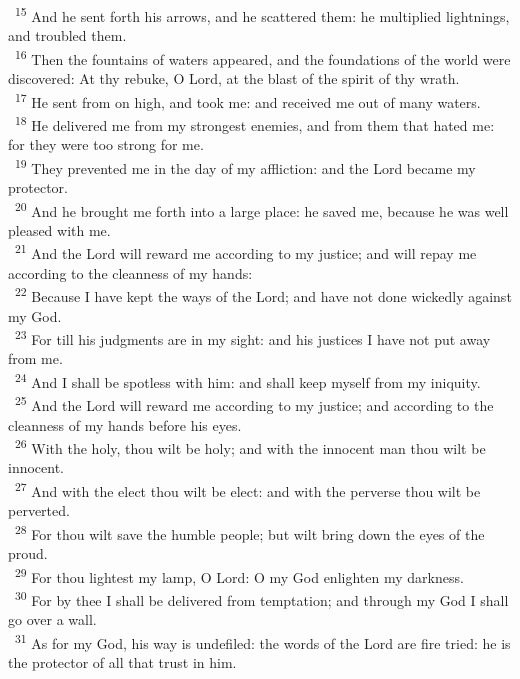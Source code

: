 \documentclass[a5paper,12pt]{article}
\begin{document}
\begin{multicols*}{2}
~\textsuperscript{15} And he sent forth his arrows, and he scattered them: he multiplied lightnings, and troubled them.\\
~\textsuperscript{16} Then the fountains of waters appeared, and the foundations of the world were discovered: At thy rebuke, O Lord, at the blast of the spirit of thy wrath.\\
~\textsuperscript{17} He sent from on high, and took me: and received me out of many waters.\\
~\textsuperscript{18} He delivered me from my strongest enemies, and from them that hated me: for they were too strong for me.\\
~\textsuperscript{19} They prevented me in the day of my affliction: and the Lord became my protector.\\
~\textsuperscript{20} And he brought me forth into a large place: he saved me, because he was well pleased with me.\\
~\textsuperscript{21} And the Lord will reward me according to my justice; and will repay me according to the cleanness of my hands:\\
~\textsuperscript{22} Because I have kept the ways of the Lord; and have not done wickedly against my God.\\
~\textsuperscript{23} For till his judgments are in my sight: and his justices I have not put away from me.\\
~\textsuperscript{24} And I shall be spotless with him: and shall keep myself from my iniquity.\\
~\textsuperscript{25} And the Lord will reward me according to my justice; and according to the cleanness of my hands before his eyes.\\
~\textsuperscript{26} With the holy, thou wilt be holy; and with the innocent man thou wilt be innocent.\\
~\textsuperscript{27} And with the elect thou wilt be elect: and with the perverse thou wilt be perverted.\\
~\textsuperscript{28} For thou wilt save the humble people; but wilt bring down the eyes of the proud.\\
~\textsuperscript{29} For thou lightest my lamp, O Lord: O my God enlighten my darkness.\\
~\textsuperscript{30} For by thee I shall be delivered from temptation; and through my God I shall go over a wall.\\
~\textsuperscript{31} As for my God, his way is undefiled: the words of the Lord are fire tried: he is the protector of all that trust in him.\\

\end{multicols*}
\end{document}
